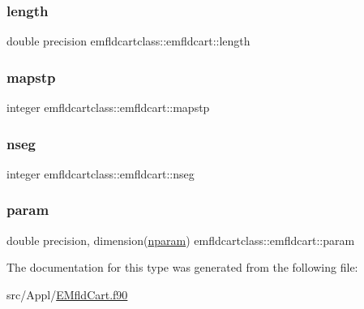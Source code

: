 \subsubsection{\texorpdfstring{length}{length}}
{\footnotesize\ttfamily double precision emfldcartclass\+::emfldcart\+::length}

\mbox{\label{structemfldcartclass_1_1emfldcart_af80bf92550bb63b5f809ab3be6bbfe8d}} 
\subsubsection{\texorpdfstring{mapstp}{mapstp}}
{\footnotesize\ttfamily integer emfldcartclass\+::emfldcart\+::mapstp}

\mbox{\label{structemfldcartclass_1_1emfldcart_acf5b75cb340cfc6f837318ed47038f25}} 
\subsubsection{\texorpdfstring{nseg}{nseg}}
{\footnotesize\ttfamily integer emfldcartclass\+::emfldcart\+::nseg}

\mbox{\label{structemfldcartclass_1_1emfldcart_a72ab84a2cacd1906ab51cb7a6637956e}} 
\subsubsection{\texorpdfstring{param}{param}}
{\footnotesize\ttfamily double precision, dimension(\mbox{\hyperlink{namespaceemfldcartclass_a72ee7da1adbf56a707b72607da000549}{nparam}}) emfldcartclass\+::emfldcart\+::param}



The documentation for this type was generated from the following file\+:\begin{DoxyCompactItemize}
\item 
src/\+Appl/\mbox{\hyperlink{_e_mfld_cart_8f90}{E\+Mfld\+Cart.\+f90}}\end{DoxyCompactItemize}
